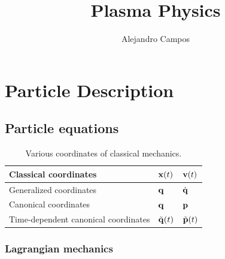 \documentclass[a4paper,11pt]{report}
\title{Plasma Physics}
\author{Alejandro Campos}
\newcommand{\qvecdot}{\dot{\qvec}}
\begin{document}
\maketitle
\tableofcontents

\part{Particle Description}                                                  %
\chapter{Particle equations}
\begin{table}[H]
    \renewcommand{\arraystretch}{1.5}
    \centering
    \caption{Various coordinates of classical mechanics. }
    \label{tb:classical_mechanics_coordinates}
     \begin{tabular}{l|l|l}
        Classical coordinates & $\mathbf{x}(t)$ & $\mathbf{v}(t)$ \\
        \hline
        Generalized coordinates  & $\mathbf{q}$ & $\qvecdot$ \\
        \hline
        Canonical coordinates & $\mathbf{q}$ & $\mathbf{p}$ \\
        \hline
        Time-dependent canonical coordinates & $\tilde{\mathbf{q}}(t)$ & $ \tilde{\mathbf{p}}(t)$ \\
     \end{tabular}
\end{table}
    
\section{Lagrangian mechanics}
    
\end{document}
